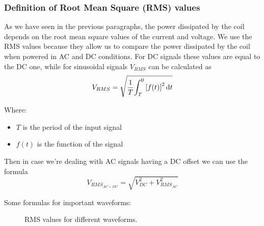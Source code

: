 \subsubsection{Definition of Root Mean Square (RMS) values}
As we have seen in the previous paragraphs, the power dissipated by the coil depends on the root mean square values of the current and voltage.
We use the RMS values because they allow us to compare the power dissipated by the coil when powered in AC and DC conditions.
For DC signals these values are equal to the DC one, while for sinusoidal signals $V_{RMS}$ can be calculated as
\begin{equation}
    V_{RMS} = \sqrt{\frac{1}{T} {\int_{T}^{0} {[f(t)]}^2\, {\rm d}t}}
\end{equation}

Where:
\begin{itemize}
    \item \(T\) is the period of the input signal
    \item \(f(t)\) is the function of the signal 
\end{itemize}

Then in case we're dealing with AC signals having a DC offset we can use the formula
\begin{equation}
    V_{RMS_{AC+DC}} = \sqrt{V_{DC}^2 + V_{RMS_{AC}}^2}
\end{equation} 

Some formulas for important waveforms:
\begin{figure}
    \centering
    \resizebox{.9\linewidth}{!}{}
    \caption{RMS values for different waveforms.}
    \label{fig: RMS_table}
\end{figure}
